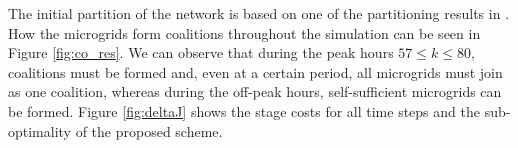 The initial partition of the network is based on one of the partitioning results in \cite{arefifar2012}. How the microgrids form coalitions throughout the simulation can be seen in Figure \ref{fig:co_res}. %
We can observe that 
 during the peak hours $57\leq k \leq 80$, coalitions must be formed and, even at a certain period, all microgrids must join as one coalition, whereas during the off-peak hours, self-sufficient microgrids can be formed. %
Figure \ref{fig:deltaJ} shows the stage costs for all time steps and the sub-optimality of the proposed scheme. %
\color{black}

